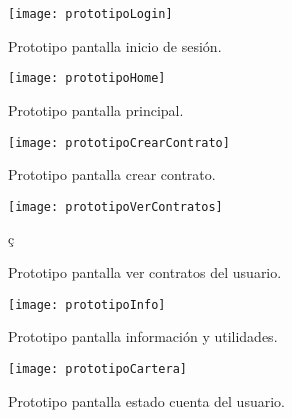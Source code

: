 \begin{figure}[h]
	\centering
	\texttt{[image: prototipoLogin]}
	\caption[Prototipo pantalla inicio de sesión]{Prototipo pantalla inicio de sesión.}
	\label{fig:prototipoLogin}
\end{figure}

\begin{figure}[h]
	\centering
	\texttt{[image: prototipoHome]}
	\caption[Prototipo pantalla principal]{Prototipo pantalla principal.}
	\label{fig:prototipoHome}
\end{figure}

\begin{figure}[h]
	\centering
	\texttt{[image: prototipoCrearContrato]}
	\caption[Prototipo pantalla crear contrato]{Prototipo pantalla crear contrato.}
	\label{fig:prototipoCrearContrato}
\end{figure}

\begin{figure}[h]
	\centering
	\texttt{[image: prototipoVerContratos]}
	\caption[Prototipo pantalla ver contratos del usuario]{Prototipo pantalla ver contratos del usuario.}ç
	\label{fig:prototipoVerContratos}
\end{figure}

\begin{figure}[h]
	\centering
	\texttt{[image: prototipoInfo]}
	\caption[Prototipo pantalla información y utilidades]{Prototipo pantalla información y utilidades.}
	\label{fig:prototipoInfo}
\end{figure}

\begin{figure}[h]
	\centering
	\texttt{[image: prototipoCartera]}
	\caption[Prototipo pantalla estado cuenta del usuario]{Prototipo pantalla estado cuenta del usuario.}
	\label{fig:prototipoCartera}
\end{figure}
